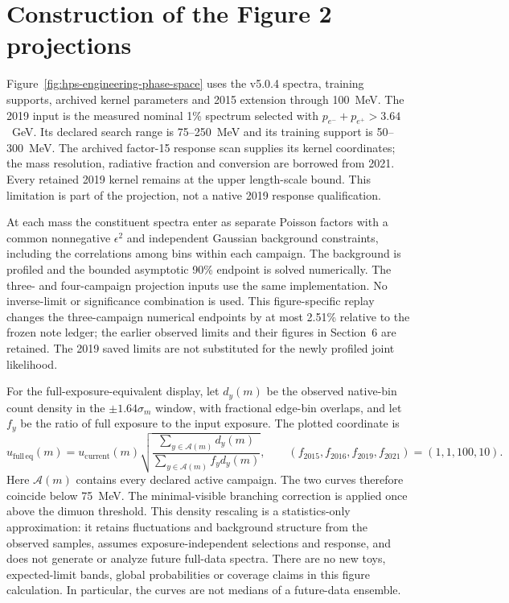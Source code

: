 
\section{Construction of the Figure 2 projections}
\label{app:figure2-projections}

Figure~\ref{fig:hps-engineering-phase-space} uses the v5.0.4 spectra,
training supports, archived kernel parameters and 2015 extension through
100~MeV. The 2019 input is the measured nominal 1\% spectrum selected with
$p_{e^-}+p_{e^+}>3.64$~GeV. Its declared search range is 75--250~MeV and its
training support is 50--300~MeV. The archived factor-15 response scan supplies
its kernel coordinates; the mass resolution, radiative fraction and conversion
are borrowed from 2021. Every retained 2019 kernel remains at the upper
length-scale bound. This limitation is part of the projection, not a native
2019 response qualification.

At each mass the constituent spectra enter as separate Poisson factors with
a common nonnegative $\epsilon^2$ and independent Gaussian background
constraints, including the correlations among bins within each campaign.
The background is profiled and the bounded asymptotic 90\% \CLs{} endpoint
is solved numerically. The three- and four-campaign projection inputs use
the same implementation. No inverse-limit or significance combination is used.
This figure-specific replay changes the three-campaign numerical endpoints
by at most 2.51\% relative to the frozen note ledger; the earlier observed
limits and their figures in Section~6 are retained. The 2019 saved limits
are not substituted for the newly profiled joint likelihood.

For the full-exposure-equivalent display, let $d_y(m)$ be the observed native-bin
count density in the $\pm1.64\sigma_m$ window, with fractional edge-bin overlaps,
and let $f_y$ be the ratio of full exposure to the input exposure. The plotted
coordinate is
\begin{equation}
 u_{\mathrm{full\,eq}}(m)=u_{\mathrm{current}}(m)
 \sqrt{\frac{\sum_{y\in\mathcal A(m)}d_y(m)}
 {\sum_{y\in\mathcal A(m)} f_y d_y(m)}},
 \qquad (f_{2015},f_{2016},f_{2019},f_{2021})=(1,1,100,10).
\end{equation}
Here $\mathcal A(m)$ contains every declared active campaign. The two curves
therefore coincide below 75~MeV. The minimal-visible branching correction is
applied once above the dimuon threshold. This density rescaling is a
statistics-only approximation: it retains fluctuations and background
structure from the observed samples, assumes exposure-independent selections
and response, and does not generate or analyze future full-data spectra.
There are no new toys, expected-limit bands, global probabilities or coverage
claims in this figure calculation. In particular, the curves are not medians
of a future-data ensemble.


